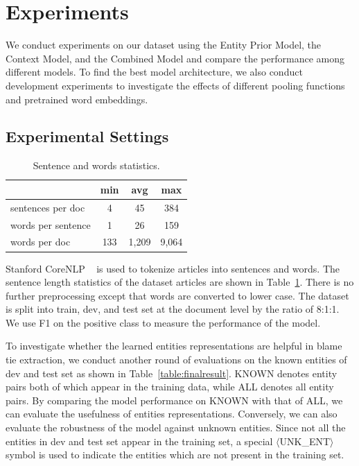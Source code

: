 \documentclass[letterpaper]{article} %
\begin{document}
\section{Experiments}
\label{experiment}

We conduct experiments on our dataset using the Entity Prior Model, the Context Model, and the Combined Model and compare the performance among different models. To find the best model architecture, we also conduct development experiments to investigate the effects of different pooling functions and pretrained word embeddings.

\subsection{Experimental Settings}

\begin{table}[t!]
\centering
\begin{tabular}{l c c c} 
 \hline
 &{\bf min} & {\bf avg}  &{\bf max} \\ 
 \hline\hline
sentences per doc & 4 & 45 & 384 \\ 
words per sentence & 1 & 26 & 159 \\
words per doc & 133 & 1,209 & 9,064 \\
 \hline
\end{tabular}
\caption{Sentence and words statistics.}
\label{table:lengthstatistic}
\end{table}

Stanford CoreNLP ~\cite{manning-EtAl:2014:P14-5} is used to tokenize articles into sentences and words. The sentence length statistics of the dataset articles are shown in Table~\ref{table:lengthstatistic}. There is no further preprocessing except that words are converted to lower case. The dataset is split into train, dev, and test set at the document level by the ratio of 8:1:1. We use F1 on the positive class to measure the performance of the model.

To investigate whether the learned entities representations are helpful in blame tie extraction, we conduct another round of evaluations on the known entities of dev and test set as shown in Table~\ref{table:finalresult}. KNOWN denotes entity pairs both of which appear in the training data, while ALL denotes all entity pairs. By comparing the model performance on KNOWN with that of ALL, we can evaluate the usefulness of entities representations. Conversely, we can also evaluate the robustness of the model against unknown entities. Since not all the entities in dev and test set appear in the training set, a special $\langle$UNK\_ENT$\rangle$ symbol is used to indicate the entities which are not present in the training set.
\end{document}

